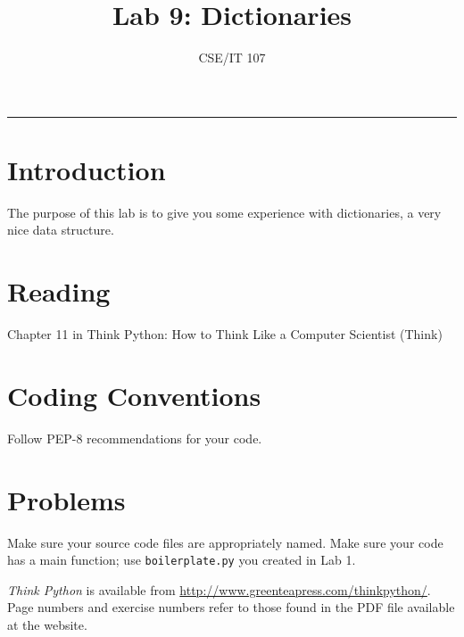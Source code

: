 \documentclass[12pt]{article}
\title{Lab 9: Dictionaries}
\author{CSE/IT 107}
\date{}
\begin{document}
\maketitle


\hrule
\section*{Introduction}

The purpose of this lab is to give you some experience with dictionaries, a very nice data structure.

\section*{Reading}

Chapter 11 in Think Python: How to Think Like a Computer Scientist (Think)

\section*{Coding Conventions}

Follow PEP-8 recommendations for your code. 

\section*{Problems}

Make sure your source code files are appropriately named. Make sure your code has a main function; use \texttt{boilerplate.py} you created in Lab 1.

\emph{Think Python} is available from \url{http://www.greenteapress.com/thinkpython/}. Page numbers and exercise numbers refer to those found in the PDF file available at the website.
\end{document}
